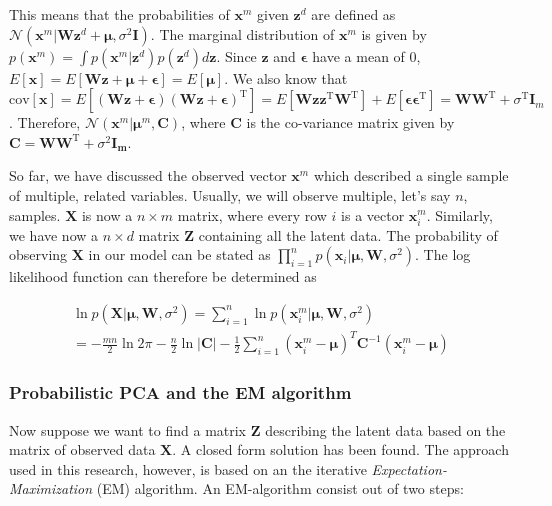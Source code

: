 This means that the probabilities of $\textbf{x}^m$ given $\textbf{z}^d$ are defined as $\mathcal{N}(\textbf{x}^m|\textbf{W}\textbf{z}^d+\bm{\mu}, \sigma^2 \textbf{I})$.
 The marginal distribution of $\textbf{x}^m$ is given by $p(\textbf{x}^m) = \int p(\textbf{x}^m|\textbf{z}^d) p(\textbf{z}^d) d\textbf{z}$. Since $\textbf{z}$ and $\bm{\epsilon}$ have a mean of $0$, $E[\textbf{x}] = E[\textbf{Wz}+\bm{\mu}+\bm{\epsilon}] = E[\bm{\mu}]$. We also know that $\text{cov}[\textbf{x}] = E[(\textbf{Wz}+\bm{\epsilon})(\textbf{Wz}+\bm{\epsilon})^\text{T}] = E[\textbf{Wz}\textbf{z}^\text{T}\textbf{W}^\text{T}]+E[\bm{\epsilon\epsilon}^\text{T}] = \textbf{WW}^\text{T}+\sigma^\text{T}\textbf{I}_m$. Therefore, $\mathcal{N}(\textbf{x}^m| \bm{\mu}^m, \textbf{C})$, where $\textbf{C}$ is the co-variance matrix given by $\textbf{C} = \textbf{WW}^\text{T} + \sigma^2 \bm{I_m}$.
 
 So far, we have discussed the observed vector $\textbf{x}^m$ which described a single sample of multiple, related variables. Usually, we will observe multiple, let's say $n$, samples. $\textbf{X}$ is now a $n\times m$ matrix, where every row $i$ is a vector $\textbf{x}^m_i$.
 Similarly, we have now a $n\times d$ matrix $\textbf{Z}$ containing all the latent data.
 The probability of observing $\textbf{X}$ in our model can be stated as $\prod^n_{i=1} p(\textbf{x}_i|\bm{\mu}, \bm{W}, \sigma^2)$. The log likelihood function can therefore be determined as
 
 \begin{equation}
 \begin{split}
     \ln p(\textbf{X}|\bm{\mu}, \bm{W}, \sigma^2) = 
     \sum^n_{i=1} \ln p(\textbf{x}^m_i|\bm{\mu}, \bm{W}, \sigma^2)\\
     = -\frac{mn}{2}\ln 2\pi - \frac{n}{2} \ln |\textbf{C}| - \frac{1}{2}\sum^n_{i=1} (\textbf{x}^m_i - \bm{\mu})^T \bm{C}^{-1}(\textbf{x}^m_i - \bm{\mu})
\end{split}
 \end{equation}


 
 \subsubsection{Probabilistic PCA and the EM algorithm}
 Now suppose we want to find a matrix $\textbf{Z}$ describing the latent data based on the matrix of observed data $\textbf{X}$. A closed form solution has been found\cite{ppca}. The approach used in this research, however, is based on an the iterative \textit{Expectation-Maximization} (EM) algorithm. An EM-algorithm consist out of two steps:
 
